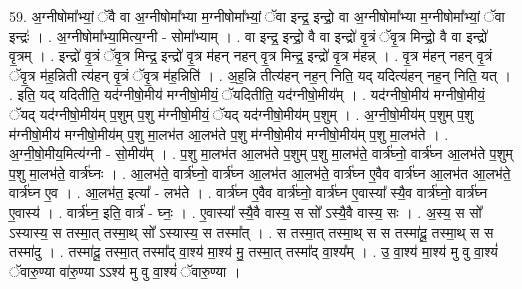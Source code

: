 \documentclass[17pt]{extarticle}
\begin{document}
59. अ॒ग्नीषोमा᳚भ्यां॒ ॅवै वा अ॒ग्नीषोमा᳚भ्या म॒ग्नीषोमा᳚भ्यां॒ ॅवा इन्द्र॒ इन्द्रो॒ वा अ॒ग्नीषोमा᳚भ्या म॒ग्नीषोमा᳚भ्यां॒ ॅवा इन्द्रः॑ । . अ॒ग्नीषोमा᳚भ्या॒मित्य॒ग्नी - सोमा᳚भ्याम् । . वा इन्द्र॒ इन्द्रो॒ वै वा इन्द्रो॑ वृ॒त्रं ॅवृ॒त्र मिन्द्रो॒ वै वा इन्द्रो॑ वृ॒त्रम् । . इन्द्रो॑ वृ॒त्रं ॅवृ॒त्र मिन्द्र॒ इन्द्रो॑ वृ॒त्र म॑हन् नहन् वृ॒त्र मिन्द्र॒ इन्द्रो॑ वृ॒त्र म॑हन्न् । . वृ॒त्र म॑हन् नहन् वृ॒त्रं ॅवृ॒त्र म॑ह॒न्निती त्य॑हन् वृ॒त्रं ॅवृ॒त्र म॑ह॒न्निति॑ । . अ॒ह॒न्नि तीत्य॑हन् नह॒न् निति॒ यद् यदित्य॑हन् नह॒न् निति॒ यत् । . इति॒ यद् यदितीति॒ यद॑ग्नीषो॒मीय॑ मग्नीषो॒मीयं॒ ॅयदितीति॒ यद॑ग्नीषो॒मीय᳚म् । . यद॑ग्नीषो॒मीय॑ मग्नीषो॒मीयं॒ ॅयद् यद॑ग्नीषो॒मीय॑म् प॒शुम् प॒शु म॑ग्नीषो॒मीयं॒ ॅयद् यद॑ग्नीषो॒मीय॑म् प॒शुम् । . अ॒ग्नी॒षो॒मीय॑म् प॒शुम् प॒शु म॑ग्नीषो॒मीय॑ मग्नीषो॒मीय॑म् प॒शु मा॒लभ॑त आ॒लभ॑ते प॒शु म॑ग्नीषो॒मीय॑ मग्नीषो॒मीय॑म् प॒शु मा॒लभ॑ते । . अ॒ग्नी॒षो॒मीय॒मित्य॑ग्नी - सो॒मीय᳚म् । . प॒शु मा॒लभ॑त आ॒लभ॑ते प॒शुम् प॒शु मा॒लभ॑ते॒ वार्त्र॑घ्नो॒ वार्त्र॑घ्न आ॒लभ॑ते प॒शुम् प॒शु मा॒लभ॑ते॒ वार्त्र॑घ्नः । . आ॒लभ॑ते॒ वार्त्र॑घ्नो॒ वार्त्र॑घ्न आ॒लभ॑त आ॒लभ॑ते॒ वार्त्र॑घ्न ए॒वैव वार्त्र॑घ्न आ॒लभ॑त आ॒लभ॑ते॒ वार्त्र॑घ्न ए॒व । . आ॒लभ॑त॒ इत्या᳚ - लभ॑ते । . वार्त्र॑घ्न ए॒वैव वार्त्र॑घ्नो॒ वार्त्र॑घ्न ए॒वास्या᳚ स्यै॒व वार्त्र॑घ्नो॒ वार्त्र॑घ्न ए॒वास्य॑ । . वार्त्र॑घ्न॒ इति॒ वार्त्र॑ - घ्नः॒ । . ए॒वास्या᳚ स्यै॒वै वास्य॒ स सो᳚ ऽस्यै॒वै वास्य॒ सः । . अ॒स्य॒ स सो᳚ ऽस्यास्य॒ स तस्मा॒त् तस्मा॒थ् सो᳚ ऽस्यास्य॒ स तस्मा᳚त् । . स तस्मा॒त् तस्मा॒थ् स स तस्मा॑दू॒ तस्मा॒थ् स स तस्मा॑दु । . तस्मा॑दू॒ तस्मा॒त् तस्मा᳚द् वा॒श्य॑ मा॒श्य॑ मु॒ तस्मा॒त् तस्मा᳚द् वा॒श्य᳚म् । . उ॒ वा॒श्य॑ मा॒श्य॑ मु वु वा॒श्यं॑ ॅवारु॒ण्या वा॑रु॒ण्या ऽऽश्य॑ मु वु वा॒श्यं॑ ॅवारु॒ण्या । \newline
\end{document}

